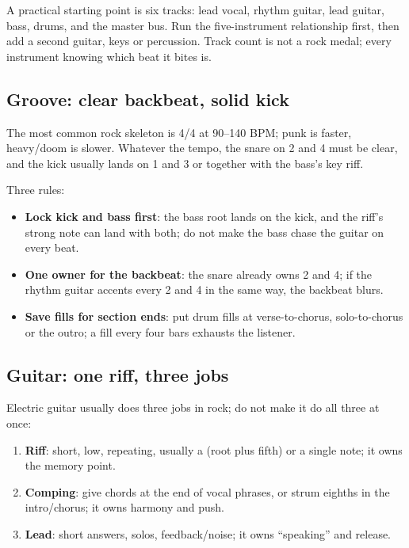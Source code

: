 A practical starting point is six tracks: lead vocal, rhythm guitar, lead guitar, bass, drums, and the master bus. Run the five-instrument relationship first, then add a second guitar, keys or percussion. Track count is not a rock medal; every instrument knowing which beat it bites is.

\subsection{Groove: clear backbeat, solid kick}
\label{sec:rock-groove}

The most common rock skeleton is 4/4 at 90--140 BPM; punk is faster, heavy/doom is slower. Whatever the tempo, the snare on 2 and 4 must be clear, and the kick usually lands on 1 and 3 or together with the bass's key riff.

Three rules:

\begin{itemize}
\item \textbf{Lock kick and bass first}: the bass root lands on the kick, and the riff's strong note can land with both; do not make the bass chase the guitar on every beat.
\item \textbf{One owner for the backbeat}: the snare already owns 2 and 4; if the rhythm guitar accents every 2 and 4 in the same way, the backbeat blurs.
\item \textbf{Save fills for section ends}: put drum fills at verse-to-chorus, solo-to-chorus or the outro; a fill every four bars exhausts the listener.
\end{itemize}

\subsection{Guitar: one riff, three jobs}
\label{sec:rock-guitar}

Electric guitar usually does three jobs in rock; do not make it do all three at once:

\begin{enumerate}
\item \textbf{Riff}: short, low, repeating, usually a  (root plus fifth) or a single note; it owns the memory point.
\item \textbf{Comping}: give chords at the end of vocal phrases, or strum eighths in the intro/chorus; it owns harmony and push.
\item \textbf{Lead}: short answers, solos, feedback/noise; it owns ``speaking'' and release.
\end{enumerate}

